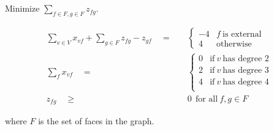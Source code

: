 \subsection{}
 
Minimize $\sum_{f \in F, g \in F} z_{fg}$.
 
\begin{align*}
 \sum_{v \in V} x_{vf} + \sum_{g \in F} z_{fg} - z_{gf}\quad =& \quad \begin{cases} -4 & f~\text{is external} \\ 4 & \text{otherwise}\end{cases} \\
 \sum_f x_{vf} \quad =& \quad \begin{cases}
                                0 & \text{if}~v~\text{has degree 2} \\
                                2 & \text{if}~v~\text{has degree 3} \\
                                4 & \text{if}~v~\text{has degree 4} \\
                              \end{cases} \\
 z_{fg} \quad \geq& \quad 0 ~~\text{for all}~f,g \in F
\end{align*}
 
where $F$ is the set of faces in the graph.
